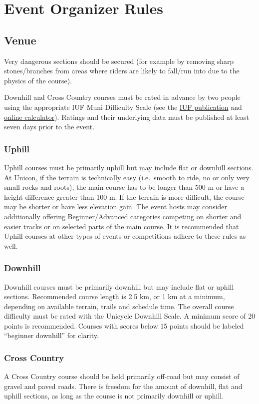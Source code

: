 \chapter{Event Organizer Rules}

\section{Venue}
Very dangerous sections should be secured (for example by removing sharp stones/branches from areas where riders are likely to fall/run into due to the physics of the course).

Downhill and Cross Country courses must be rated in advance by two people using the appropriate IUF Muni Difficulty Scale (see the \href{https://unicycling.org/files/iuf-muni-difficulty-scale.pdf}{IUF publication} and \href{https://muni-scale.info/}{online calculator}).
Ratings and their underlying data must be published at least seven days prior to the event.

\subsection{Uphill}
Uphill courses must be primarily uphill but may include flat or downhill sections.
At Unicon, if the terrain is technically easy (i.e.\ smooth to ride, no or only very small rocks and roots), the main course has to be longer than 500 m or have a height difference greater than 100 m.
If the terrain is more difficult, the course may be shorter or have less elevation gain.
The event hosts may consider additionally offering Beginner/Advanced categories competing on shorter and easier tracks or on selected parts of the main course.
It is recommended that Uphill courses at other types of events or competitions adhere to these rules as well.

\subsection{Downhill}
Downhill courses must be primarily downhill but may include flat or uphill sections.
Recommended course length is 2.5 km, or 1 km at a minimum, depending on available terrain, trails and schedule time.
The overall course difficulty must be rated with the Unicycle Downhill Scale.
A minimum score of 20 points is recommended.
Courses with scores below 15 points should be labeled ``beginner downhill'' for clarity.

\subsection{Cross Country}
A Cross Country course should be held primarily off-road but may consist of gravel and paved roads.
There is freedom for the amount of downhill, flat and uphill sections, as long as the course is not primarily downhill or uphill.

